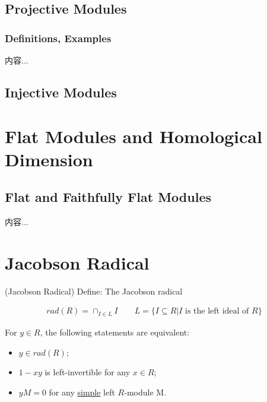 \documentclass[Total.tex]{subfiles}
\begin{document}
	\section{Projective Modules}
	\subsection{Definitions, Examples}
	
	\begin{Def}
		内容...
	\end{Def}
	\section{Injective Modules}
	\chapter{Flat Modules and Homological Dimension}
	
	\section{Flat and Faithfully Flat Modules}
	
	\begin{Def}
		内容...
	\end{Def}
	\chapter{Jacobson Radical}
	
	\begin{Def}
		(Jacobson Radical) Define: The Jacobson radical
		
		\begin{gather*}
			rad(R)=\cap_{I\in L} I\qquad L=\{I\subseteq R|I\mbox{ is the left ideal of }R\}
		\end{gather*}
	\end{Def}
	
	\begin{lemma}
		For $y\in R$, the following statements are equivalent:
		
		\begin{itemize}
			\item $y\in rad(R)$;
			\item $1-xy$ is left-invertible for any $x\in R$;
			\item $yM=0$ for any \underline{simple} left $R$-module M.
		\end{itemize}
	\end{lemma}
	
\end{document}
